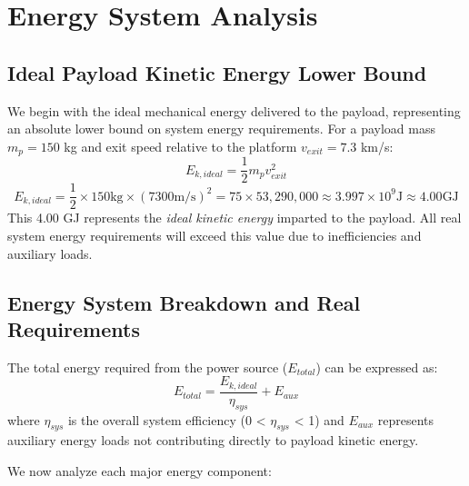 \section{Energy System Analysis}
\label{sec:energy}

\subsection{Ideal Payload Kinetic Energy Lower Bound}
We begin with the ideal mechanical energy delivered to the payload, representing an absolute lower bound on system energy requirements. For a payload mass $m_p = 150$ kg and exit speed relative to the platform $v_{exit} = 7.3$ km/s:
\begin{equation}
E_{k,ideal} = \frac{1}{2} m_p v_{exit}^2
\end{equation}
\begin{equation}
E_{k,ideal} = \frac{1}{2} \times 150  \text{kg} \times (7300  \text{m/s})^2 = 75 \times 53,290,000 \approx 3.997 \times 10^9  \text{J} \approx 4.00  \text{GJ}
\end{equation}
This 4.00 GJ represents the \textit{ideal kinetic energy} imparted to the payload. All real system energy requirements will exceed this value due to inefficiencies and auxiliary loads.

\subsection{Energy System Breakdown and Real Requirements}
The total energy required from the power source ($E_{total}$) can be expressed as:
\begin{equation}
E_{total} = \frac{E_{k,ideal}}{\eta_{sys}} + E_{aux}
\end{equation}
where $\eta_{sys}$ is the overall system efficiency (0 < $\eta_{sys}$ < 1) and $E_{aux}$ represents auxiliary energy loads not contributing directly to payload kinetic energy.

We now analyze each major energy component:

